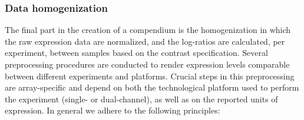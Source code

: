 

\subsubsection{Data homogenization}

The final part in the creation of a compendium is the homogenization in which
the raw expression data are normalized, and the log-ratios are calculated,
per experiment, between samples based on the contrast specification.
%
Several preprocessing procedures are conducted to render expression levels
comparable between different experiments and platforms.
%
Crucial steps in this preprocessing are array-specific and depend on both the
technological platform used to perform the experiment (single- or
dual-channel), as well as on the reported units of expression.
In general we adhere to the following principles: 
%
%
